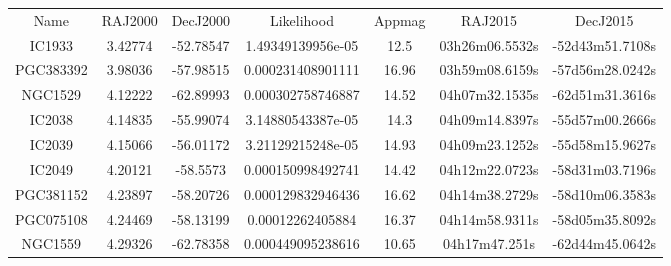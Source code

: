 \documentclass[a4paper,10pt]{article}
\begin{document}
\begin{table}
\begin{tiny}
\begin{tabular}{ccccccc}
Name & RAJ2000 & DecJ2000 & Likelihood & Appmag & RAJ2015 & DecJ2015 \\
IC1933 & 3.42774 & -52.78547 & 1.49349139956e-05 & 12.5 & 03h26m06.5532s & -52d43m51.7108s \\

PGC383392 & 3.98036 & -57.98515 & 0.000231408901111 & 16.96 & 03h59m08.6159s & -57d56m28.0242s \\

NGC1529 & 4.12222 & -62.89993 & 0.000302758746887 & 14.52 & 04h07m32.1535s & -62d51m31.3616s \\
IC2038 & 4.14835 & -55.99074 & 3.14880543387e-05 & 14.3 & 04h09m14.8397s & -55d57m00.2666s \\
IC2039 & 4.15066 & -56.01172 & 3.21129215248e-05 & 14.93 & 04h09m23.1252s & -55d58m15.9627s \\
IC2049 & 4.20121 & -58.5573 & 0.000150998492741 & 14.42 & 04h12m22.0723s & -58d31m03.7196s \\

PGC381152 & 4.23897 & -58.20726 & 0.000129832946436 & 16.62 & 04h14m38.2729s & -58d10m06.3583s \\

PGC075108 & 4.24469 & -58.13199 & 0.00012262405884 & 16.37 & 04h14m58.9311s & -58d05m35.8092s \\

NGC1559 & 4.29326 & -62.78358 & 0.000449095238616 & 10.65 & 04h17m47.251s & -62d44m45.0642s \\


\end{tabular}
\end{tiny}
\end{table}
\end{document}
